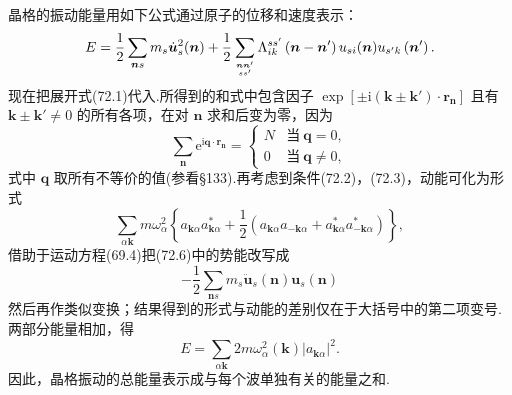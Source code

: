 晶格的振动能量用如下公式通过原子的位移和速度表示：
\begin{equation}
  E=\frac{1}{2}\sum_{\boldsymbol{n}s}m_s\dot{\boldsymbol{u}}_s^2(\boldsymbol{n})
  +\frac{1}{2}\sum_{\boldsymbol{n}\boldsymbol{n}'\atop ss'}\Lambda_{ik}^{ss'}\left(\boldsymbol{n}-\boldsymbol{n}'\right)u_{si}(\boldsymbol{n})u_{s'k}\left(\boldsymbol{n}'\right).
\end{equation}
现在把展开式(72.1)代入.所得到的和式中包含因子 $\exp\left[\pm\mathrm{i}\left(\boldsymbol{k}\pm\boldsymbol{k}'\right)\cdot\boldsymbol{r}_{\boldsymbol{n}}\right]$ 且有 $\boldsymbol{k}\pm\boldsymbol{k}'\neq0$ 的所有各项，在对 $\boldsymbol{n}$ 求和后变为零，因为
\begin{equation*}
  \sum_{\boldsymbol{n}}\mathrm{e}^{\mathrm{i}\boldsymbol{q}\cdot\boldsymbol{r}_{\boldsymbol{n}}}
  =\left\{\begin{array}{cl}
    N & \text{当}\ \boldsymbol{q}=0,\\
    0 & \text{当}\ \boldsymbol{q}\neq0,
  \end{array}\right.
\end{equation*}
式中 $\boldsymbol{q}$ 取所有不等价的值(参看§133).再考虑到条件(72.2)，(72.3)，动能可化为形式
\begin{equation*}
  \sum_{\alpha\boldsymbol{k}}m\omega_\alpha^2\left\{a_{\boldsymbol{k}\alpha}a_{\boldsymbol{k}\alpha}^{*}
  +\frac{1}{2}\left(a_{\boldsymbol{k}\alpha}a_{-\boldsymbol{k}\alpha}+a_{\boldsymbol{k}\alpha}^{*}a_{-\boldsymbol{k}\alpha}^{*}\right)\right\},
\end{equation*}
借助于运动方程(69.4)把(72.6)中的势能改写成
\begin{equation*}
  -\frac{1}{2}\sum_{\boldsymbol{n}s}m_s\ddot{\boldsymbol{u}}_s(\boldsymbol{n})\boldsymbol{u}_s(\boldsymbol{n})
\end{equation*}
然后再作类似变换；结果得到的形式与动能的差别仅在于大括号中的第二项变号.两部分能量相加，得
\begin{equation}
  E=\sum_{\alpha\boldsymbol{k}}2m\omega_\alpha^2(\boldsymbol{k})\left|a_{\boldsymbol{k}\alpha}\right|^2.
\end{equation}
因此，晶格振动的总能量表示成与每个波单独有关的能量之和.

